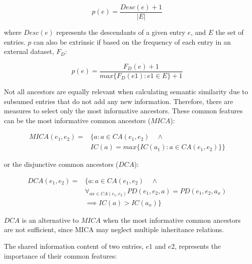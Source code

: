 \begin{equation}
    p(e) = \frac{Desc(e)+1}{|E|}
\end{equation}

where $Desc(e)$ represents the descendants of a given entry $e$, and $E$ the set of entries. $p$ can also be extrinsic if based on the frequency of each entry in an external dataset, $F_D$:

\begin{equation}
    p(e) = \frac{F_D(e)+1}{max\{F_D(e1):e1 \in E\} + 1}
\end{equation}



Not all ancestors are equally relevant when calculating semantic similarity due to subsumed entries that do not add any new information. Therefore, there are measures to select only the most informative ancestors. These common features can be the most informative common ancestors ($MICA$):

\begin{equation}
\begin{aligned}
    MICA(e_1, e_2) ={} & \{a:a \in CA(e_1,e_2) \quad \land\\
                       & IC(a) = max\{IC(a_1):a \in CA(e_1,e_2)\}\}
\end{aligned}
\end{equation}

or the disjunctive common ancestors ($DCA$):

\begin{equation}
\begin{aligned}
    DCA(e_1, e_2) ={} & \{a:a \in CA(e_1,e_2) \quad \land \\
                    & \forall_{ax \in CA(e_1,e_2)} PD(e_1,e_2,a) = PD(e_1,e_2,a_x) \\
                    & \implies IC(a) > IC(a_x)\}
\end{aligned}
\end{equation}

$DCA$ is an alternative to $MICA$ when the most informative common ancestors are not sufficient, since MICA may neglect multiple inheritance relations. 

The shared information content of two entries, $e1$ and $e2$, represents the importance of their common features:


